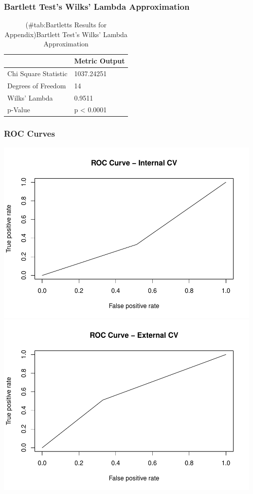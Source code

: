 \documentclass[american,]{article}
\begin{document}
\hypertarget{bartlett-tests-wilks-lambda-approximation}{%
\subsubsection{Bartlett Test's Wilks' Lambda Approximation}\label{bartlett-tests-wilks-lambda-approximation}}

\begin{table}[t]

\caption{(\#tab:Bartletts Results for Appendix)Bartlett Test's Wilks' Lambda Approximation}
\centering
\begin{tabular}{ll}
\toprule
  & Metric Output\\
\midrule
Chi Square Statistic & 1037.24251\\
Degrees of Freedom & 14\\
Wilks' Lambda & 0.9511\\
p-Value & p < 0.0001\\
\bottomrule
\end{tabular}
\end{table}

\hypertarget{roc-curves}{%
\subsubsection{ROC Curves}\label{roc-curves}}

\includegraphics{Final_Project_Applied_files/figure-latex/ROC curves-1.pdf} \includegraphics{Final_Project_Applied_files/figure-latex/ROC curves-2.pdf}


\end{document}
